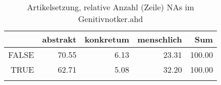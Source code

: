 \begin{table}[ht]
\centering
\begin{tabular}{rrrrr}
  \lsptoprule
 & abstrakt & konkretum & menschlich & Sum \\ 
  \midrule
FALSE & 70.55 & 6.13 & 23.31 & 100.00 \\ 
  TRUE & 62.71 & 5.08 & 32.20 & 100.00 \\ 
   \lspbottomrule
\end{tabular}
\caption{Artikelsetzung, relative Anzahl (Zeile) NAs im Genitivnotker.ahd} 
\end{table}
